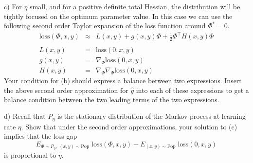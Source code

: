 \documentclass{article}
\begin{document}
c)  
For $\eta$ small, and for a positive definite total Hessian, the distribution will be tightly focused on the optimum parameter
value.  In this case we can use the following second order Taylor expansion of the loss function
around $\Phi^* = 0$.
\begin{eqnarray*}
\mathrm{loss}(\Phi,x,y) & \approx & L(x,y) + g(x,y) \Phi + \frac{1}{2} \Phi^\top H(x,y) \Phi \\
\\
L(x,y) & = & \mathrm{loss}(0,x,y) \\
g(x,y) & = & \nabla_\Phi \mathrm{loss}(0,x,y) \\
H(x,y) & = & \nabla_\Phi \nabla_\Phi \mathrm{loss}(0,x,y)
\end{eqnarray*}
Your condition for (b) should express a balance between two expressions. Insert the above second order approximation for $\hat{g}$ into each of these expressions
to get a balance condition between the two leading terms of the two expressions. 


d) Recall that $P_\eta$ is the stationary distribution of the Markov process at learning rate $\eta$.
Show that under the second order approximations, your solution to (c) implies that the loss gap
$$E_{\Phi\sim P_\eta,\; (x,y) \sim \mathrm{Pop}}\; \mathrm{loss}(\Phi,x,y) - E_{(x,y) \sim \mathrm{Pop}}\; \mathrm{loss}(0,x,y)$$
is proportional to $\eta$.

\end{document}

